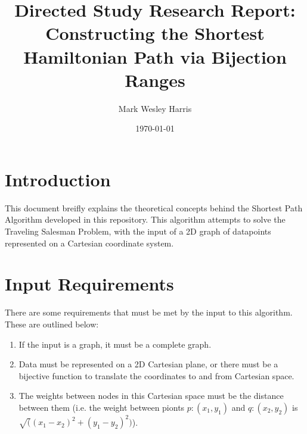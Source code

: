\documentclass[12pt]{article}
\title{Directed Study Research Report:
Constructing the Shortest Hamiltonian Path via Bijection Ranges}
\author{
Mark Wesley Harris
}
\date{\today}
\begin{document}
\maketitle

\section{Introduction}\label{sec:intro}
This document breifly explains the theoretical concepts behind the
Shortest Path Algorithm developed in this repository. This algorithm attempts
to solve the Traveling Salesman Problem, with the input of a 2D graph of datapoints
represented on a Cartesian coordinate system.

\section{Input Requirements}\label{sec:req}
There are some requirements that must be met by the input to this algorithm.
These are outlined below:
\begin{enumerate}
\item If the input is a graph, it must be a complete graph.
\item Data must be represented on a 2D Cartesian plane,
or there must be a bijective function to translate the coordinates to and from
Cartesian space.
\item The weights between nodes in this Cartesian space must be the distance between them
(i.e. the weight between pionts $p:(x_1, y_1)$ and $q:(x_2, y_2)$ is
$\sqrt((x_1 - x_2)^2 + (y_1 - y_2)^2)$).
\end{enumerate}
\end{document}
